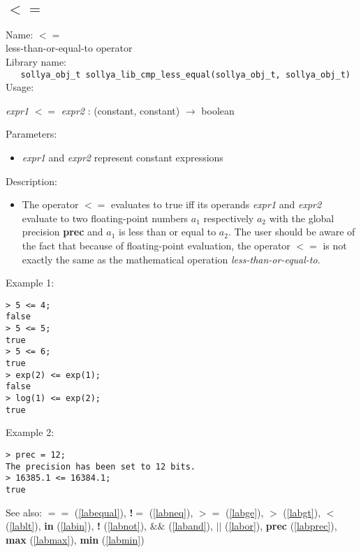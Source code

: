 \subsection{$<=$}
\label{lable}
\noindent Name: \textbf{$<=$}\\
\phantom{aaa}less-than-or-equal-to operator\\[0.2cm]
\noindent Library name:\\
\verb|   sollya_obj_t sollya_lib_cmp_less_equal(sollya_obj_t, sollya_obj_t)|\\[0.2cm]
\noindent Usage: 
\begin{center}
\emph{expr1} \textbf{$<=$} \emph{expr2} : (\textsf{constant}, \textsf{constant}) $\rightarrow$ \textsf{boolean}\\
\end{center}
Parameters: 
\begin{itemize}
\item \emph{expr1} and \emph{expr2} represent constant expressions
\end{itemize}
\noindent Description: \begin{itemize}

\item The operator \textbf{$<=$} evaluates to true iff its operands \emph{expr1} and
   \emph{expr2} evaluate to two floating-point numbers $a_1$
   respectively $a_2$ with the global precision \textbf{prec} and
   $a_1$ is less than or equal to $a_2$. The user should
   be aware of the fact that because of floating-point evaluation, the
   operator \textbf{$<=$} is not exactly the same as the mathematical
   operation \emph{less-than-or-equal-to}.
\end{itemize}
\noindent Example 1: 
\begin{center}\begin{minipage}{15cm}\begin{Verbatim}[frame=single,commandchars=\\\|\~]
> 5 <= 4;
false
> 5 <= 5;
true
> 5 <= 6;
true
> exp(2) <= exp(1);
false
> log(1) <= exp(2);
true
\end{Verbatim}
\end{minipage}\end{center}
\noindent Example 2: 
\begin{center}\begin{minipage}{15cm}\begin{Verbatim}[frame=single,commandchars=\\\|\~]
> prec = 12;
The precision has been set to 12 bits.
> 16385.1 <= 16384.1;
true
\end{Verbatim}
\end{minipage}\end{center}
See also: \textbf{$==$} (\ref{labequal}), \textbf{!$=$} (\ref{labneq}), \textbf{$>=$} (\ref{labge}), \textbf{$>$} (\ref{labgt}), \textbf{$<$} (\ref{lablt}), \textbf{in} (\ref{labin}), \textbf{!} (\ref{labnot}), \textbf{$\&\&$} (\ref{laband}), \textbf{$||$} (\ref{labor}), \textbf{prec} (\ref{labprec}), \textbf{max} (\ref{labmax}), \textbf{min} (\ref{labmin})
